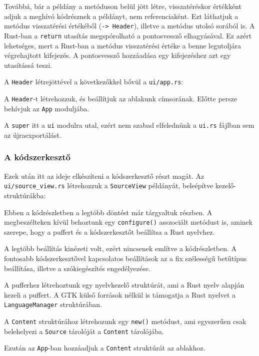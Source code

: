 Továbbá, bár a példány a metóduson belül jött létre, visszatéréskor értékként adjuk a meghívó
kódrésznek a példányt, nem referenciaként.
Ezt láthatjuk a metódus visszatérési értékéből (\verb+-> Header+), 
illetve a metódus utolsó sorából is.
A Rust-ban a \texttt{return} utasítás megspórolható a pontosvessző elhagyásával.
Ez azért lehetséges, mert a Rust-ban a metódus visszatérési értéke a benne legutoljára végrehajtott kifejezés.
A pontosvessző hozzáadása egy kifejezéshez azt egy utasítássá teszi.

A \texttt{Header} létrejöttével a következőkkel bővül a \texttt{ui/app.rs}:



A \texttt{Header}-t létrehozzuk, és beállítjuk az ablakunk címsorának.
Előtte persze behívjuk az \texttt{App} moduljába.

A \texttt{super} itt a \texttt{ui} modulra utal, ezért nem szabad elfelednünk a \texttt{ui.rs}
fájlban sem az újraexportálást.



\subsubsection{A kódszerkesztő}

Ezek után itt az ideje elkészíteni a kódszerkesztő részt magát.
Az \verb+ui/source_view.rs+ létrehozzuk a \texttt{SourceView} példányát,
beleépítve kezelő-struktúrákba:



Ebben a kódrészletben a legtöbb döntést már tárgyaltuk  részben.
A megbeszélteken kívül behoztunk egy \texttt{configure()} asszociált metódust is,
aminek szerepe, hogy a puffert és a kódszerkesztőt beállítsa a Rust nyelvhez.

A legtöbb beállítás kinézeti volt, ezért nincsenek említve a kódrészletben.
A fontosabb kódszerkesztővel kapcsolatos beállítások az a fix szélességű betűtípus beállítása,
illetve a szókiegészítés engedélyezése.

A pufferhez létrehoztunk egy nyelvkezelő struktúrát, ami a Rust nyelv alapján kezeli a puffert.
A GTK külső források nélkül is támogatja a Rust nyelvet a \texttt{LanguageManager} struktúrában.

A \texttt{Content} struktúrához létrehozunk egy \texttt{new()} metódust, ami egyszerűen csak
belehelyezi a \texttt{Source} tárolóját a \texttt{Content} tárolójába.

Ezután az \texttt{App}-ban hozzáadjuk a \texttt{Content} struktúrát az ablakhoz.

